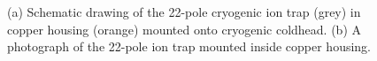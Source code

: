 \begin{figure}
    \centering
    \hfill
    
    \caption{(a) Schematic drawing of the 22-pole cryogenic ion trap (grey) in copper housing (orange) mounted onto cryogenic coldhead. (b) A photograph of the 22-pole ion trap mounted inside copper housing.}
    \label{fig:22PT}
\end{figure}

